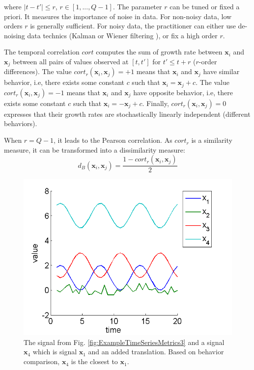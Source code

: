 \noindent where $|t-t'| \leq r$, $r \in [1,..., Q-1]$. The parameter $r$ can be tuned or fixed a priori. It measures the importance of noise in data. For non-noisy data, low orders $r$ is generally sufficient. For noisy data, the practitioner can either use de-noising data technics (Kalman or Wiener filtering \cite{Kalman1960,WienerN1942}), or fix a high order $r$.

The temporal correlation $cort$ computes the sum of growth rate between $\textbf{x}_i$ and $\textbf{x}_j$ between all pairs of values observed at $[t ,t']$ for $t' \leq t+r$ ($r$-order differences). The value $cort_r(\textbf{x}_i,\textbf{x}_j) = +1$ means that $\textbf{x}_i$ and $\textbf{x}_j$  have similar behavior, i.e, there exists some constant $c$ such that $\textbf{x}_i = \textbf{x}_j+c$. The value $cort_r(\textbf{x}_i,\textbf{x}_j) = -1$ means that $\textbf{x}_i$ and $\textbf{x}_j$ have opposite behavior, i.e, there exists some constant $c$ such that $\textbf{x}_i = -\textbf{x}_j+c$. Finally, $cort_r(\textbf{x}_i,\textbf{x}_j) = 0$ expresses that their growth rates are stochastically linearly independent (different behaviors). 

When $r=Q-1$, it leads to the Pearson correlation. As $cort_r$ is a similarity measure, it can be transformed into a dissimilarity measure:
\begin{equation}
	d_B(\textbf{x}_i,\textbf{x}_j) = \frac{1 - cort_r(\textbf{x}_i,\textbf{x}_j)}{2}
	\label{eq:B}
\end{equation}

\begin{figure}[h!]
	\centering
	\includegraphics[width=0.7\linewidth]{images/ExampleTimeSeriesMetrics4}
	\caption{The signal from Fig. \ref{fig:ExampleTimeSeriesMetrics3} and a signal $\textbf{x}_4$ which is signal $\textbf{x}_1$ and an added translation. Based on behavior comparison, $\textbf{x}_4$ is the closest to $\textbf{x}_1$.}
	\label{fig:ExampleTimeSeriesMetrics4}
\end{figure}

